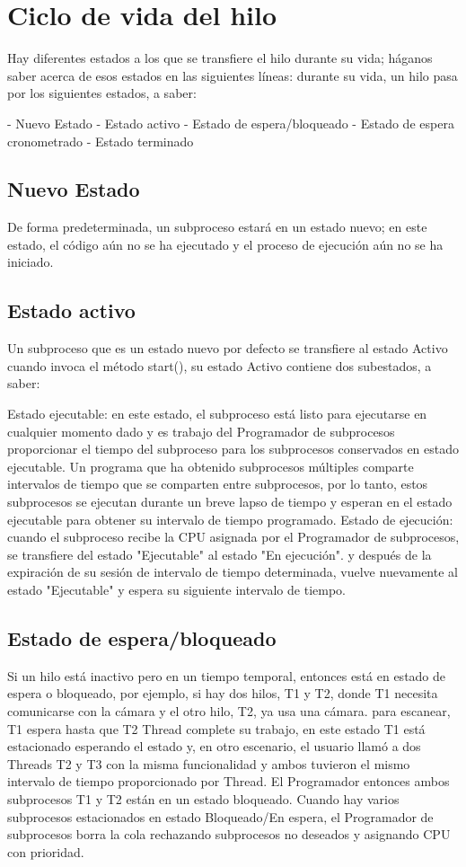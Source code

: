 \documentclass{article}
\begin{document}
\section{Ciclo de vida del hilo}
Hay diferentes estados a los que se transfiere el hilo durante su vida; háganos saber acerca de esos estados en las siguientes líneas: durante su vida, un hilo pasa por los siguientes estados, a saber:

- Nuevo Estado
- Estado activo
- Estado de espera/bloqueado
- Estado de espera cronometrado
- Estado terminado

\subsection{Nuevo Estado}

De forma predeterminada, un subproceso estará en un estado nuevo; en este estado, el código aún no se ha ejecutado y el proceso de ejecución aún no se ha iniciado.

\subsection{Estado activo}

Un subproceso que es un estado nuevo por defecto se transfiere al estado Activo cuando invoca el método start(), su estado Activo contiene dos subestados, a saber:

Estado ejecutable: en este estado, el subproceso está listo para ejecutarse en cualquier momento dado y es trabajo del Programador de subprocesos proporcionar el tiempo del subproceso para los subprocesos conservados en estado ejecutable. Un programa que ha obtenido subprocesos múltiples comparte intervalos de tiempo que se comparten entre subprocesos, por lo tanto, estos subprocesos se ejecutan durante un breve lapso de tiempo y esperan en el estado ejecutable para obtener su intervalo de tiempo programado.
Estado de ejecución: cuando el subproceso recibe la CPU asignada por el Programador de subprocesos, se transfiere del estado "Ejecutable" al estado "En ejecución". y después de la expiración de su sesión de intervalo de tiempo determinada, vuelve nuevamente al estado "Ejecutable" y espera su siguiente intervalo de tiempo.

\subsection{Estado de espera/bloqueado}

Si un hilo está inactivo pero en un tiempo temporal, entonces está en estado de espera o bloqueado, por ejemplo, si hay dos hilos, T1 y T2, donde T1 necesita comunicarse con la cámara y el otro hilo, T2, ya usa una cámara. para escanear, T1 espera hasta que T2 Thread complete su trabajo, en este estado T1 está estacionado esperando el estado y, en otro escenario, el usuario llamó a dos Threads T2 y T3 con la misma funcionalidad y ambos tuvieron el mismo intervalo de tiempo proporcionado por Thread. El Programador entonces ambos subprocesos T1 y T2 están en un estado bloqueado. Cuando hay varios subprocesos estacionados en estado Bloqueado/En espera, el Programador de subprocesos borra la cola rechazando subprocesos no deseados y asignando CPU con prioridad.
\end{document}

